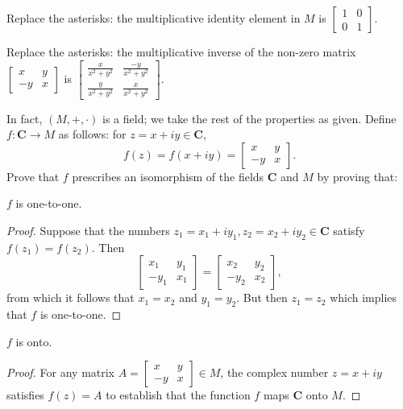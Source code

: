 \documentclass[11pt]{article}       %
\theoremstyle{definition}
\begin{document}
\medskip
{} Replace the asterisks: the multiplicative identity element in $M$ is $\begin{bmatrix}  1 & 0 \\ 0 & 1 \end{bmatrix}$.

\medskip
{} Replace the asterisks: the multiplicative inverse of the non-zero matrix $\begin{bmatrix}  x & y \\ -y & x \end{bmatrix}$ is 
$\begin{bmatrix} \frac{x}{x^2+y^2} & \frac{-y}{x^2+y^2} \\ \frac{y}{x^2+y^2} & \frac{x}{x^2+y^2} \end{bmatrix}$.

In fact, $(M, +, \cdot)$ is a field; we take the rest of the properties as given.  Define $f: \mathbf C \longrightarrow M$ as follows:  for $z=x+iy \in \mathbf C$,
\[
f(z)=f (x+iy) = \begin{bmatrix}  x & y \\ -y & x \end{bmatrix}.
\]
\medskip
{}  Prove that $f$ prescribes an isomorphism of the fields $\mathbf C$ and $M$ by proving that:

\medskip
{}  $f$ is one-to-one. \, {}
\begin{proof}
Suppose that the numbers $z_1 = x_1+iy_1, z_2=x_2+iy_2 \in \mathbf C$ satisfy $f(z_1)=f(z_2)$. Then
\[
\begin{bmatrix}  x_1 & y_1 \\ -y_1 & x_1 \end{bmatrix} = \begin{bmatrix}  x_2 & y_2 \\ -y_2 & x_2 \end{bmatrix},
\]
from which it follows that $x_1=x_2$ and $y_1=y_2$. But then $z_1=z_2$ which implies that $f$ is one-to-one.
\end{proof}

\medskip
{}  $f$ is onto. \, {}
\begin{proof}
For any matrix $A=\begin{bmatrix} x & y \\ -y & x \end{bmatrix} \in M$, the complex number $z=x+iy$ satisfies $f(z)=A$ to establish that the function $f$ maps $\mathbf C$ onto $M$.
\end{proof}
\end{document}
